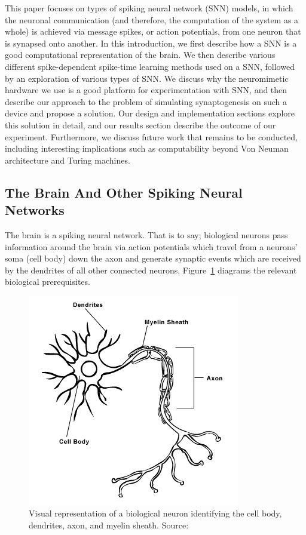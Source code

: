 \documentclass[journal]{./sty/IEEEtran}
\begin{document}
This paper focuses on types of spiking neural network (SNN) models, in which the neuronal communication (and therefore, the computation of the system as a whole) is achieved via message spikes, or action potentials, from one neuron that is synapsed onto another. 
In this introduction, we first describe how a SNN is a good computational representation of the brain. 
We then describe various different spike-dependent spike-time learning methods used on a SNN, followed by an exploration of various types of SNN. 
We discuss why the neuromimetic hardware we use is a good platform for experimentation with SNN, and then describe our approach to the problem of simulating synaptogenesis on such a device and propose a solution. 
Our design and implementation sections explore this solution in detail, 
and our results section describe the outcome of our experiment.
Furthermore, we discuss future work that remains to be conducted, including interesting implications such as computability beyond Von Neuman architecture and Turing machines.

\subsection{The Brain And Other Spiking Neural Networks}
The brain is a spiking neural network. 
That is to say; biological neurons pass information around the brain via action potentials which travel from a neurons' soma (cell body) down the axon and generate synaptic events which are received by the dendrites of all other connected neurons.
Figure~\ref{fig:neuron} diagrams the relevant biological prerequisites.

\begin{figure}
\centering
\includegraphics[scale=0.6]{imgs/neuron.png}
\caption{Visual representation of a biological neuron identifying the cell body, dendrites, axon, and myelin sheath. 
Source: \cite{img:N} \label{fig:neuron}}
\end{figure}
\end{document}
